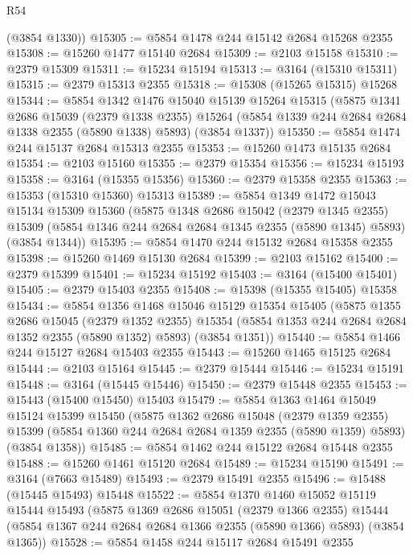 \begin{lexlean}{R54}
\begin{coremodule}
      (@3854 @1330))
@15305 := @5854 @1478 @244 @15142 @2684 @15268 @2355
@15308 := @15260 @1477 @15140 @2684
@15309 := @2103 @15158
@15310 := @2379 @15309
@15311 := @15234 @15194
@15313 := @3164 (@15310 @15311)
@15315 := @2379 @15313 @2355
@15318 := @15308 (@15265 @15315) @15268
@15344 := @5854
    @1342
    @1476
    @15040
    @15139
    @15264
    @15315
    (@5875
      @1341
      @2686
      @15039
      (@2379 @1338 @2355)
      @15264
      (@5854 @1339 @244 @2684 @2684 @1338 @2355 (@5890 @1338) @5893)
      (@3854 @1337))
@15350 := @5854 @1474 @244 @15137 @2684 @15313 @2355
@15353 := @15260 @1473 @15135 @2684
@15354 := @2103 @15160
@15355 := @2379 @15354
@15356 := @15234 @15193
@15358 := @3164 (@15355 @15356)
@15360 := @2379 @15358 @2355
@15363 := @15353 (@15310 @15360) @15313
@15389 := @5854
    @1349
    @1472
    @15043
    @15134
    @15309
    @15360
    (@5875
      @1348
      @2686
      @15042
      (@2379 @1345 @2355)
      @15309
      (@5854 @1346 @244 @2684 @2684 @1345 @2355 (@5890 @1345) @5893)
      (@3854 @1344))
@15395 := @5854 @1470 @244 @15132 @2684 @15358 @2355
@15398 := @15260 @1469 @15130 @2684
@15399 := @2103 @15162
@15400 := @2379 @15399
@15401 := @15234 @15192
@15403 := @3164 (@15400 @15401)
@15405 := @2379 @15403 @2355
@15408 := @15398 (@15355 @15405) @15358
@15434 := @5854
    @1356
    @1468
    @15046
    @15129
    @15354
    @15405
    (@5875
      @1355
      @2686
      @15045
      (@2379 @1352 @2355)
      @15354
      (@5854 @1353 @244 @2684 @2684 @1352 @2355 (@5890 @1352) @5893)
      (@3854 @1351))
@15440 := @5854 @1466 @244 @15127 @2684 @15403 @2355
@15443 := @15260 @1465 @15125 @2684
@15444 := @2103 @15164
@15445 := @2379 @15444
@15446 := @15234 @15191
@15448 := @3164 (@15445 @15446)
@15450 := @2379 @15448 @2355
@15453 := @15443 (@15400 @15450) @15403
@15479 := @5854
    @1363
    @1464
    @15049
    @15124
    @15399
    @15450
    (@5875
      @1362
      @2686
      @15048
      (@2379 @1359 @2355)
      @15399
      (@5854 @1360 @244 @2684 @2684 @1359 @2355 (@5890 @1359) @5893)
      (@3854 @1358))
@15485 := @5854 @1462 @244 @15122 @2684 @15448 @2355
@15488 := @15260 @1461 @15120 @2684
@15489 := @15234 @15190
@15491 := @3164 (@7663 @15489)
@15493 := @2379 @15491 @2355
@15496 := @15488 (@15445 @15493) @15448
@15522 := @5854
    @1370
    @1460
    @15052
    @15119
    @15444
    @15493
    (@5875
      @1369
      @2686
      @15051
      (@2379 @1366 @2355)
      @15444
      (@5854 @1367 @244 @2684 @2684 @1366 @2355 (@5890 @1366) @5893)
      (@3854 @1365))
@15528 := @5854 @1458 @244 @15117 @2684 @15491 @2355

\end{coremodule}
\end{lexlean}
